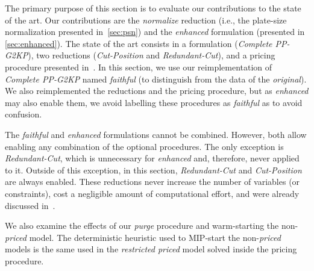 \documentclass[smallextended]{svjour3}       %
\begin{document}
The primary purpose of this section is to evaluate our contributions to the state of the art.
Our contributions are the \emph{normalize} reduction (i.e., the plate-size normalization presented in~\autoref{sec:psn}) and the \emph{enhanced} formulation (presented in \autoref{sec:enhanced}).
The state of the art consists in a formulation (\emph{Complete PP-G2KP}), two reductions (\emph{Cut-Position} and \emph{Redundant-Cut}), and a pricing procedure presented in~\cite{furini:2016,dimitri_thesis}.
In this section, we use our reimplementation of \emph{Complete PP-G2KP} named \emph{faithful} (to distinguish from the data of the \emph{original}).
We also reimplemented the reductions and the pricing procedure, but as \emph{enhanced} may also enable them, we avoid labelling these procedures as \emph{faithful} as to avoid confusion.

The \emph{faithful} and \emph{enhanced} formulations cannot be combined.
However, both allow enabling any combination of the optional procedures.
The only exception is \emph{Redundant-Cut}, which is unnecessary for \emph{enhanced} and, therefore, never applied to it.
Outside of this exception, in this section, \emph{Redundant-Cut} and \emph{Cut-Position} are always enabled.
These reductions never increase the number of variables (or constraints), cost a negligible amount of computational effort, and were already discussed in~\cite{furini:2016,dimitri_thesis}.

We also examine the effects of our \emph{purge} procedure and warm-starting the non-\emph{priced} model.
The deterministic heuristic used to MIP-start the non-\emph{priced} models is the same used in the \emph{restricted priced} model solved inside the pricing procedure.
\end{document}
